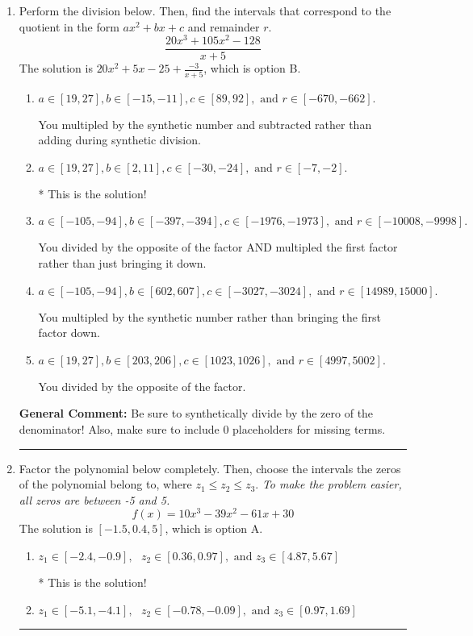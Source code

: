 \documentclass{extbook}[14pt]
\newcommand{\litem}[1]{\item #1

\rule{\textwidth}{0.4pt}}
\begin{document}
\begin{enumerate}\litem{
Perform the division below. Then, find the intervals that correspond to the quotient in the form $ax^2+bx+c$ and remainder $r$.
\[ \frac{20x^{3} +105 x^{2} -128}{x + 5} \]The solution is \( 20x^{2} +5 x -25 + \frac{-3}{x + 5} \), which is option B.\begin{enumerate}[label=\Alph*.]
\item \( a \in [19, 27], b \in [-15, -11], c \in [89, 92], \text{ and } r \in [-670, -662]. \)

 You multipled by the synthetic number and subtracted rather than adding during synthetic division.
\item \( a \in [19, 27], b \in [2, 11], c \in [-30, -24], \text{ and } r \in [-7, -2]. \)

* This is the solution!
\item \( a \in [-105, -94], b \in [-397, -394], c \in [-1976, -1973], \text{ and } r \in [-10008, -9998]. \)

 You divided by the opposite of the factor AND multipled the first factor rather than just bringing it down.
\item \( a \in [-105, -94], b \in [602, 607], c \in [-3027, -3024], \text{ and } r \in [14989, 15000]. \)

 You multipled by the synthetic number rather than bringing the first factor down.
\item \( a \in [19, 27], b \in [203, 206], c \in [1023, 1026], \text{ and } r \in [4997, 5002]. \)

 You divided by the opposite of the factor.
\end{enumerate}

\textbf{General Comment:} Be sure to synthetically divide by the zero of the denominator! Also, make sure to include 0 placeholders for missing terms.
}
\litem{
Factor the polynomial below completely. Then, choose the intervals the zeros of the polynomial belong to, where $z_1 \leq z_2 \leq z_3$. \textit{To make the problem easier, all zeros are between -5 and 5.}
\[ f(x) = 10x^{3} -39 x^{2} -61 x + 30 \]The solution is \( [-1.5, 0.4, 5] \), which is option A.\begin{enumerate}[label=\Alph*.]
\item \( z_1 \in [-2.4, -0.9], \text{   }  z_2 \in [0.36, 0.97], \text{   and   } z_3 \in [4.87, 5.67] \)

* This is the solution!
\item \( z_1 \in [-5.1, -4.1], \text{   }  z_2 \in [-0.78, -0.09], \text{   and   } z_3 \in [0.97, 1.69] \)


\end{enumerate}}
\end{enumerate}
\end{document}
